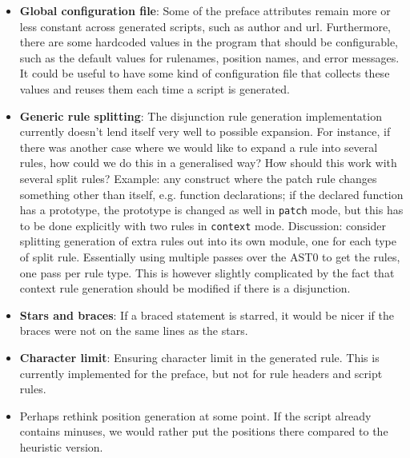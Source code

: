 \begin{itemize}
\item \textbf{Global configuration file}: Some of the preface attributes remain more or less constant across generated scripts, such as author and url. Furthermore, there are some hardcoded values in the program that should be configurable, such as the default values for rulenames, position names, and error messages.\newline
It could be useful to have some kind of configuration file that collects these values and reuses them each time a script is generated.
\item \textbf{Generic rule splitting}: The disjunction rule generation implementation currently doesn't lend itself very well to possible expansion. For instance, if there was another case where we would like to expand a rule into several rules, how could we do this in a generalised way? How should this work with several split rules?\newline
Example: any construct where the patch rule changes something other than itself, e.g. function declarations; if the declared function has a prototype, the prototype is changed as well in \texttt{patch} mode, but this has to be done explicitly with two rules in \texttt{context} mode.\newline
Discussion: consider splitting generation of extra rules out into its own module, one for each type of split rule. Essentially using multiple passes over the AST0 to get the rules, one pass per rule type. This is however slightly complicated by the fact that context rule generation should be modified if there is a disjunction.
\item \textbf{Stars and braces}: If a braced statement is starred, it would be nicer if the braces were not on the same lines as the stars.
\item \textbf{Character limit}: Ensuring character limit in the generated rule. This is currently implemented for the preface, but not for rule headers and script rules.
\item Perhaps rethink position generation at some point. If the script already contains minuses, we would rather put the positions there compared to the heuristic version.
\end{itemize}
